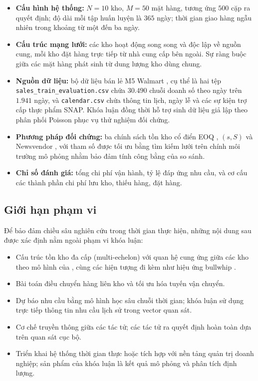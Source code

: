 \begin{itemize}
    \item \textbf{Cấu hình hệ thống:} $N = 10$ kho, $M = 50$ mặt hàng, tương
    ứng $500$ cặp ra quyết định; độ dài mỗi tập huấn luyện là $365$ ngày; thời
    gian giao hàng ngẫu nhiên trong khoảng từ một đến ba ngày.

    \item \textbf{Cấu trúc mạng lưới:} các kho hoạt động song song và độc lập
    về nguồn cung, mỗi kho đặt hàng trực tiếp từ nhà cung cấp bên ngoài. Sự
    ràng buộc giữa các mặt hàng phát sinh từ dung lượng kho dùng chung.

    \item \textbf{Nguồn dữ liệu:} bộ dữ liệu bán lẻ M5 Walmart
    \parencite{makridakis2022background}, cụ thể là hai tệp
    \texttt{sales\_train\_evaluation.csv} chứa $30.490$ chuỗi doanh số theo
    ngày trên $1.941$ ngày, và \texttt{calendar.csv} chứa thông tin lịch, ngày
    lễ và các sự kiện trợ cấp thực phẩm SNAP. Khóa luận đồng thời hỗ trợ sinh
    dữ liệu giả lập theo phân phối Poisson phục vụ thử nghiệm đối chứng.

    \item \textbf{Phương pháp đối chứng:} ba chính sách tồn kho cổ điển EOQ
    \parencite{harris1913}, $(s, S)$ \parencite{scarf1960} và Newsvendor
    \parencite{arrow1951}, với tham số được tối ưu bằng tìm kiếm lưới trên
    chính môi trường mô phỏng nhằm bảo đảm tính công bằng của so sánh.

    \item \textbf{Chỉ số đánh giá:} tổng chi phí vận hành, tỷ lệ đáp ứng nhu
    cầu, và cơ cấu các thành phần chi phí lưu kho, thiếu hàng, đặt hàng.
\end{itemize}

\subsection{Giới hạn phạm vi}
\label{subsec:phamvingoai}

Để bảo đảm chiều sâu nghiên cứu trong thời gian thực hiện, những nội dung sau
được xác định nằm ngoài phạm vi khóa luận:

\begin{itemize}
    \item Cấu trúc tồn kho đa cấp (multi-echelon) với quan hệ cung ứng giữa các
    kho theo mô hình của \textcite{clark1960}, cùng các hiện tượng đi kèm như
    hiệu ứng bullwhip \parencite{lee1997}.
    \item Bài toán điều chuyển hàng liên kho và tối ưu hóa tuyến vận chuyển.
    \item Dự báo nhu cầu bằng mô hình học sâu chuỗi thời gian; khóa luận sử
    dụng trực tiếp thông tin nhu cầu lịch sử trong vector quan sát.
    \item Cơ chế truyền thông giữa các tác tử; các tác tử ra quyết định hoàn
    toàn dựa trên quan sát cục bộ.
    \item Triển khai hệ thống thời gian thực hoặc tích hợp với nền tảng quản trị
    doanh nghiệp; sản phẩm của khóa luận là kết quả mô phỏng và phân tích định
    lượng.
\end{itemize}


